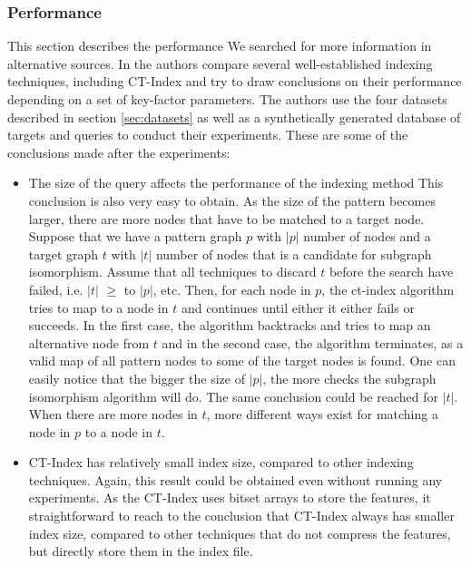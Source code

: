 \documentclass{l4proj}
\begin{document}
\subsubsection{Performance}
\label{sec:ct-index-performance}
This section describes the performance 
We searched for more information in alternative sources. In \cite{foteini} the authors compare several well-established indexing techniques, including CT-Index and try to draw conclusions on their performance depending on a set of key-factor parameters. The authors use the four datasets described in section \ref{sec:datasets} as well as a synthetically generated database of targets and queries to conduct their experiments. These are some of the conclusions made after the experiments:
\begin{itemize}
\item The size of the query affects the performance of the indexing method\newline
This conclusion is also very easy to obtain. As the size of the pattern becomes larger, there are more nodes that have to be matched to a target node. Suppose that we have a pattern graph $p$ with $|p|$ number of nodes and a target graph $t$ with $|t|$ number of nodes that is a candidate for subgraph isomorphism. Assume that all techniques to discard $t$ before the search have failed, i.e. $|t|$ $\geq$ to $|p|$, etc. Then, for each node in $p$, the ct-index algorithm tries to map to a node in $t$ and continues until either it either fails or succeeds. In the first case, the algorithm backtracks and tries to map an alternative node from $t$ and in the second case, the algorithm terminates, as a valid map of all pattern nodes to some of the target nodes is found. One can easily notice that the bigger the size of $|p|$, the more checks the subgraph isomorphism algorithm will do. The same conclusion could be reached for $|t|$. When there are more nodes in $t$, more different ways exist for matching a node in $p$ to a node in $t$.
\item CT-Index has relatively small index size, compared to other indexing techniques.\newline
Again, this result could be obtained even without running any experiments. As the CT-Index uses bitset arrays to store the features, it straightforward to reach to the conclusion that CT-Index always has smaller index size, compared to other techniques that do not compress the features, but directly store them in the index file.\par
\end{itemize}
\end{document}
